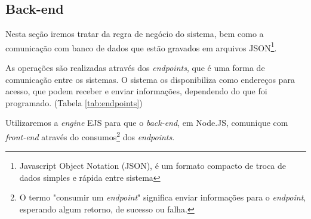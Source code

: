 \subsection{Back-end}

Nesta seção iremos tratar da regra de negócio do sistema, bem como a comunicação com banco de dados que estão gravados em arquivos JSON\footnote{Javascript Object Notation (JSON), é um formato compacto de troca de dados simples e rápida entre sistema}.

As operações são realizadas através dos \textit{endpoints}, que é uma forma de comunicação entre os sistemas. O sistema os disponibiliza como endereços para acesso, que podem receber e enviar informações, dependendo do que foi programado. (Tabela \ref{tab:endpoints})

Utilizaremos a \textit{engine} EJS para que o \textit{back-end}, em Node.JS, comunique com \textit{front-end} através do consumos\footnote{O termo "consumir um \textit{endpoint}" significa enviar informações para o \textit{endpoint}, esperando algum retorno, de sucesso ou falha.} dos \textit{endpoints}.

